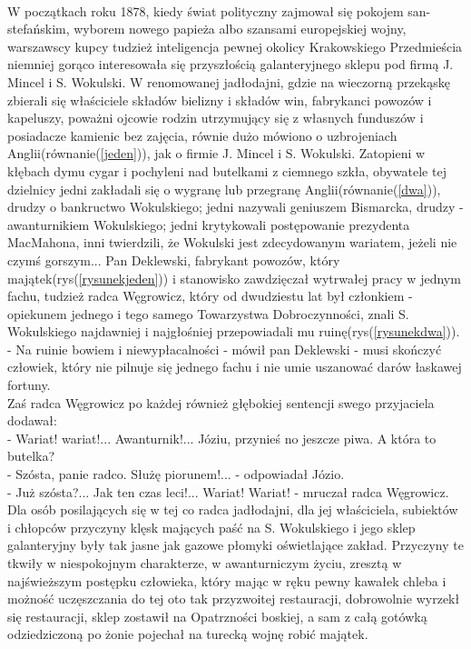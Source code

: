 \documentclass[11pt]{article}
\begin{document}
\paragraph{}
W początkach roku 1878\cite{a}, kiedy świat polityczny zajmował się pokojem san-stefańskim, 
wyborem nowego papieża albo szansami europejskiej wojny, warszawscy kupcy tudzież inteligencja pewnej 
okolicy Krakowskiego Przedmieścia niemniej gorąco interesowała się przyszłością galanteryjnego sklepu pod firmą J. Mincel i S. Wokulski.
W renomowanej jadłodajni, gdzie na wieczorną przekąskę zbierali się właściciele składów bielizny i składów win, 
fabrykanci powozów i kapeluszy, poważni ojcowie rodzin utrzymujący się z własnych funduszów i posiadacze kamienic bez zajęcia, 
równie dużo mówiono o uzbrojeniach Anglii(równanie(\ref{jeden})), jak o firmie J. Mincel i S. Wokulski. Zatopieni w kłębach dymu cygar i pochyleni nad butelkami 
z ciemnego szkła, obywatele tej dzielnicy jedni zakładali się o wygranę lub przegranę Anglii(równanie(\ref{dwa})), drudzy o bankructwo Wokulskiego; 
jedni nazywali geniuszem Bismarcka, drudzy - awanturnikiem Wokulskiego; jedni krytykowali postępowanie prezydenta MacMahona, 
inni twierdzili, że Wokulski jest zdecydowanym wariatem, jeżeli nie czymś gorszym...
Pan Deklewski, fabrykant powozów, który majątek(rys(\ref{rysunekjeden})) i stanowisko zawdzięczał wytrwałej pracy w jednym fachu, 
tudzież radca Węgrowicz, który od dwudziestu lat był członkiem - opiekunem jednego i tego samego Towarzystwa Dobroczynności, 
znali S. Wokulskiego\cite{b} najdawniej i najgłośniej przepowiadali mu ruinę(rys(\ref{rysunekdwa})).\\
- Na ruinie bowiem i niewypłacalności - mówił pan Deklewski - musi skończyć człowiek, który nie pilnuje się jednego fachu i nie umie uszanować darów łaskawej fortuny.\\
Zaś radca Węgrowicz po każdej również głębokiej sentencji swego przyjaciela dodawał:\\
- Wariat! wariat!... Awanturnik!... Józiu, przynieś no jeszcze piwa. A która to butelka?\\
- Szósta, panie radco. Służę piorunem!... - odpowiadał Józio.\\
- Już szósta?... Jak ten czas leci!... Wariat! Wariat! - mruczał radca Węgrowicz.\\
Dla osób posilających się w tej co radca jadłodajni, dla jej właściciela, subiektów i chłopców przyczyny klęsk mających paść na S. Wokulskiego
i jego sklep galanteryjny były tak jasne jak gazowe płomyki oświetlające zakład. 
Przyczyny te tkwiły w niespokojnym charakterze, w awanturniczym życiu, zresztą w najświeższym postępku człowieka, 
który mając w ręku pewny kawałek chleba i możność uczęszczania do tej oto tak przyzwoitej restauracji, dobrowolnie wyrzekł się restauracji, 
sklep zostawił na Opatrzności boskiej, a sam z całą gotówką odziedziczoną po żonie pojechał na turecką wojnę robić majątek.
\newpage
\end{document}
